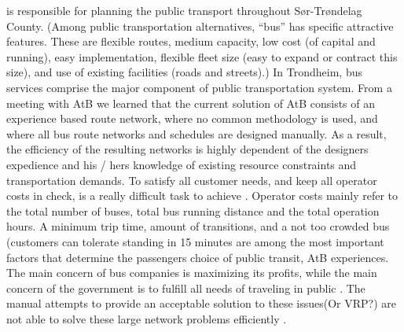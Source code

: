  \citet{website:atb} is responsible for planning the public transport throughout Sør-Trøndelag County. (Among public transportation alternatives, “bus” has specific attractive features. These are flexible routes, medium capacity, low cost (of capital and running), easy implementation, flexible fleet size (easy to expand or contract this size), and use of existing facilities (roads and streets).) In Trondheim, bus services comprise the major component of public transportation system. From a meeting with AtB we learned that the current solution of AtB consists of an experience based route network, where no common methodology is used, and where all bus route networks and schedules are designed manually. As a result, the efficiency of the resulting networks is highly dependent of the designers expedience and his / hers knowledge of existing resource constraints and transportation demands. To satisfy all customer needs, and keep all operator costs in check, is a really difficult task to achieve \citep{kechagiopoulos13}. Operator costs mainly refer to the total number of buses, total bus running distance and the total operation hours. A minimum trip time, amount of transitions, and a not too crowded bus (customers can tolerate standing in 15 minutes are among the most important factors that determine the passengers choice of public transit, AtB experiences.  The main concern of bus companies is maximizing its profits, while the main concern of the government is to fulfill all needs of traveling in public \citep{kechagiopoulos13}. The manual attempts to provide an acceptable solution to these issues(Or VRP?) are not able to solve these large network problems efficiently \citep{kechagiopoulos13}. 


















